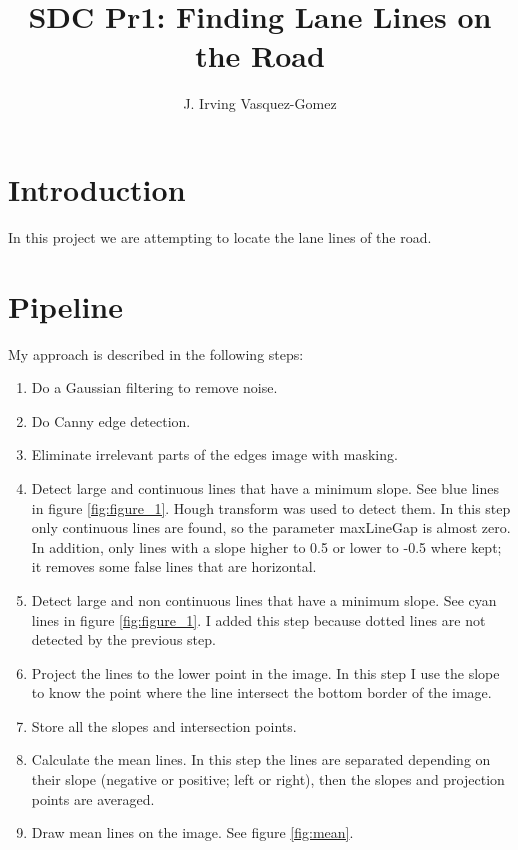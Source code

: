 \documentclass[]{article}
\title{SDC Pr1: Finding Lane Lines on the Road}
\author{J. Irving Vasquez-Gomez}
\begin{document}
\maketitle



\section{Introduction}

In this project we are attempting to locate the lane lines of the road.

\section{Pipeline}

My approach is described in the following steps:

\begin{enumerate}
	\item Do a Gaussian filtering to remove noise.
	\item Do Canny edge detection.
	\item Eliminate irrelevant parts of the edges image with masking. 
	\item Detect large and continuous lines that have a minimum slope. See blue lines in figure \ref{fig:figure_1}. Hough transform was used to detect them. In this step only continuous lines are found, so the parameter maxLineGap is almost zero. In addition, only lines with a slope higher to 0.5 or lower to -0.5 where kept; it removes some false lines that are horizontal. 
	\item Detect large and non continuous lines that have a minimum slope. See cyan lines in figure \ref{fig:figure_1}.  I added this step because dotted lines are not detected by the previous step.
	\item Project the lines to the lower point in the image. In this step I use the slope to know the point where the line intersect the bottom border of the image.
	\item Store all the slopes and intersection points.
	\item Calculate the mean lines. In this step the lines are separated depending on their slope (negative or positive; left or right), then the slopes and projection points are averaged.
    \item Draw mean lines on the image. See figure \ref{fig:mean}.
\end{enumerate}
\end{document}
